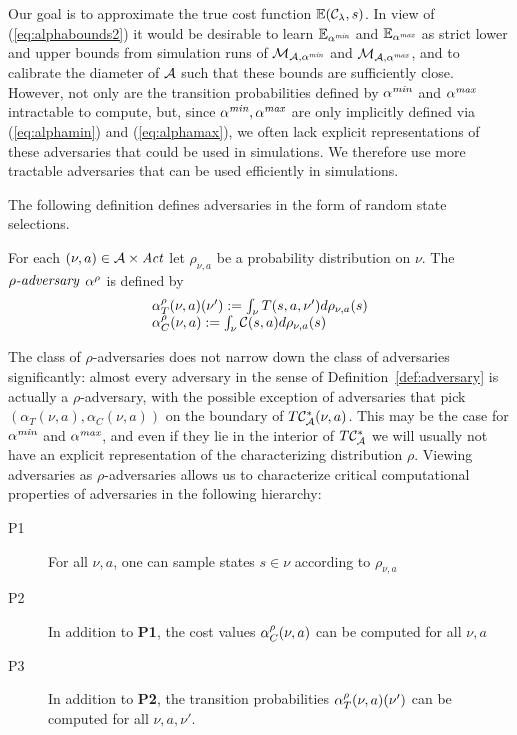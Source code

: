\documentclass{llncs}
\begin{document}
Our goal is to approximate the true cost function $\mathbb{E}(\mathcal{C}_\lambda,s)$. In view of
(\ref{eq:alphabounds2}) it would be desirable to learn $\mathbb{E}_{\alpha^{\emph{min}}}$ and
$\mathbb{E}_{\alpha^{\emph{max}}}$ as strict lower and upper bounds from simulation runs of
$\mathcal{M}_{\mathcal{A},\alpha^{\emph{min}}}$ and $\mathcal{M}_{\mathcal{A},\alpha^{\emph{max}}}$, and to calibrate the diameter of
$\mathcal{A}$ such that these bounds are sufficiently close. However, not only are the transition
probabilities defined by $\alpha^{\emph{min}}$ and
$\alpha^{\emph{max}}$ intractable to compute, but, since $\alpha^{\emph{min}},\alpha^{\emph{max}}$ are only implicitly defined via
(\ref{eq:alphamin}) and  (\ref{eq:alphamax}), we often lack explicit representations of these adversaries that
could be used in simulations. We therefore use more tractable adversaries that can be
used efficiently in simulations.

The following definition defines adversaries in the form of random state selections. 


\begin{definition}
For each $(\nu,a)\in\mathcal{A}\times\mathit{Act}$ let $\rho_{\nu,a}$ be a probability distribution on $\nu$.
The $\rho\emph{-adversary}$ $\alpha^{\rho}$ is defined by
\begin{equation}
\label{eq:rhoadv}
\begin{array}{l}
\alpha^{\rho}_T(\nu,a)(\nu'):=\int_\nu T(s,a,\nu')d\rho_{\nu,a}(s) \\
\alpha^{\rho}_C(\nu,a):=\int_\nu \mathcal{C}(s,a)d\rho_{\nu,a}(s)
\end{array}
\end{equation}
\end{definition}

The class of $\rho$-adversaries does not narrow down the class of adversaries significantly:
almost every adversary in the sense of
Definition~\ref{def:adversary}  is actually a $\rho$-adversary, with the possible exception
of adversaries that
pick $(\alpha_T(\nu,a),\alpha_C(\nu,a))$ on the boundary of  $T\mathcal{C}^*_{\mathcal{A}}(\nu,a)$.
This may be the case for $\alpha^{\emph{min}}$ and $\alpha^{\emph{max}}$, and even if they lie in the interior of
$T\mathcal{C}^*_{\mathcal{A}}$ we will usually not have an explicit representation of the characterizing
distribution $\rho$. Viewing adversaries as $\rho$-adversaries allows us to characterize critical
computational properties of adversaries in the  following hierarchy:

\begin{description}
\item[P1] For all $\nu,a$, one can  sample states $s\in\nu$ according to $\rho_{\nu,a}$
\item[P2] In addition to {\bf P1}, the cost values $\alpha^{\rho}_C(\nu,a)$ can be computed for all $\nu,a$
\item[P3] In addition to {\bf P2}, the transition probabilities $\alpha^{\rho}_T(\nu,a)(\nu')$ can be computed for all
$\nu,a,\nu'$. 
\end{description}
\end{document}
